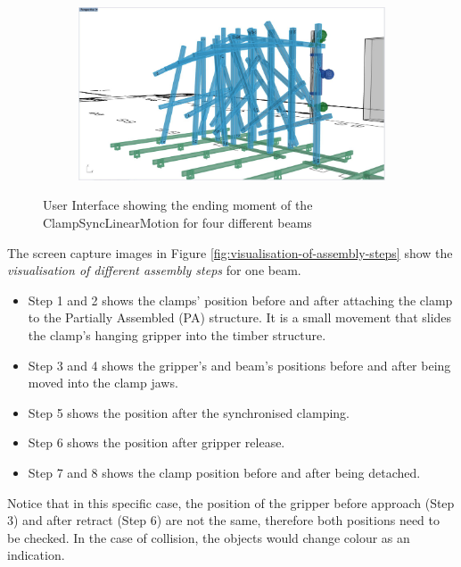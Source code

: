 \begin{figure}[!h]
\begin{subfigure}[b]{0.49\textwidth}
    \end{subfigure}
    \hfill
    \begin{subfigure}[b]{0.49\textwidth}
        \centering
        \includegraphics[width=\textwidth]{images/6a/img45.jpg}
    \end{subfigure}
    \caption{User Interface showing the ending moment of the ClampSyncLinearMotion for four different beams}
    \label{fig:clamp_sync_linear_motion}
\end{figure}

\FloatBarrier

The screen capture images in Figure \ref{fig:visualisation-of-assembly-steps} show the \textit{visualisation of different assembly steps} for one beam. 

\begin{itemize}
	\item Step 1 and 2 shows the clamps’ position before and after attaching the clamp to the Partially Assembled (PA) structure. It is a small movement that slides the clamp's hanging gripper into the timber structure. 
	\item Step 3 and 4 shows the gripper’s and beam’s positions before and after being moved into the clamp jaws. 
	\item Step 5 shows the position after the synchronised clamping.
	\item Step 6 shows the position after gripper release. 
	\item Step 7 and 8 shows the clamp position before and after being detached.
\end{itemize}

Notice that in this specific case, the position of the gripper before approach (Step 3) and after retract (Step 6) are not the same, therefore both positions need to be checked. In the case of collision, the objects would change colour as an indication.

